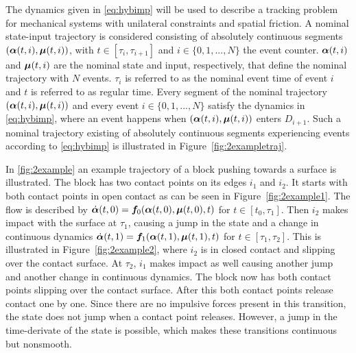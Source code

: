 \documentclass[../DC2017114Bouma.tex]{subfiles}
\begin{document}
The dynamics given in \eqref{eq:hybimp} will be used to describe a tracking problem for mechanical systems with unilateral constraints and spatial friction. A nominal state-input trajectory is considered consisting of absolutely continuous segments $(\boldsymbol{\alpha}(t,i),\boldsymbol{\mu}(t,i))$, with $t\in\left[\tau_i,\tau_{i+1}\right]$ and $i\in\{0,1,...,N\}$ the event counter. $\boldsymbol{\alpha}(t,i)$ and $\boldsymbol{\mu}(t,i)$ are the nominal state and input, respectively, that define the nominal trajectory with $N$ events. $\tau_i$ is referred to as the nominal event time of event $i$ and $t$ is referred to as regular time. Every segment of the nominal trajectory $(\boldsymbol{\alpha}(t,i),\boldsymbol{\mu}(t,i))$ and every event $i\in\{0,1,...,N\}$ satisfy the dynamics in \eqref{eq:hybimp}, where an event happens when $(\boldsymbol{\alpha}(t,i),\boldsymbol{\mu}(t,i))$ enters $D_{i+1}$. Such a nominal trajectory existing of absolutely continuous segments experiencing events according to \eqref{eq:hybimp} is illustrated in Figure~\ref{fig:2exampletraj}.

In \ref{fig:2example} an example trajectory of a block pushing towards a surface is illustrated. The block has two contact points on its edges $i_1$ and $i_2$. It starts with both contact points in open contact as can be seen in Figure~\ref{fig:2example1}. The flow is described by $\dot{\boldsymbol{\alpha}}(t,0) = {\boldsymbol{f}}_0(\boldsymbol{\alpha}(t,0),\boldsymbol{\mu}(t,0),t)$ for $t\in[t_0,\tau_1]$. Then $i_2$ makes impact with the surface at $\tau_1$, causing a jump in the state and a change in continuous dynamics $\dot{\boldsymbol{\alpha}}(t,1) = {\boldsymbol{f}}_1(\boldsymbol{\alpha}(t,1),\boldsymbol{\mu}(t,1),t)$ for $t\in[\tau_1,\tau_2]$. This is illustrated in Figure~\ref{fig:2example2}, where $i_2$ is in closed contact and slipping over the contact surface. At $\tau_2$, $i_1$ makes impact as well causing another jump and another change in continuous dynamics. The block now has both contact points slipping over the contact surface. After this both contact points release contact one by one. Since there are no impulsive forces present in this transition, the state does not jump when a contact point releases. However, a jump in the time-derivate of the state is possible, which makes these transitions continuous but nonsmooth.
\end{document}
